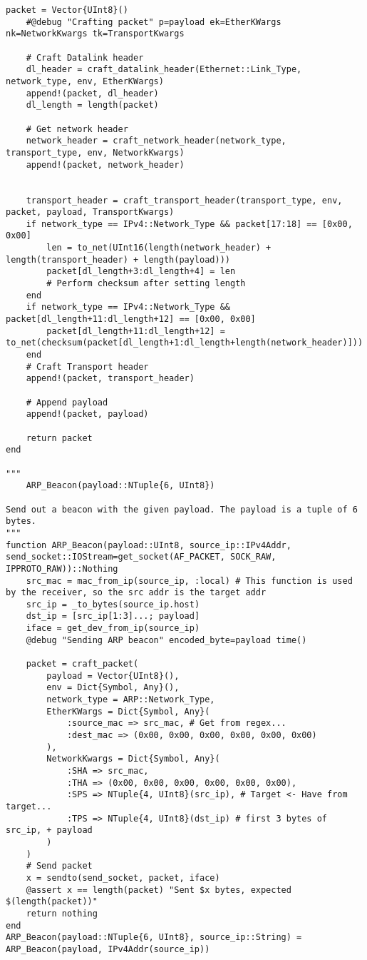 \begin{lstlisting}[language=JuliaLocal, style=julia]
    packet = Vector{UInt8}()
    #@debug "Crafting packet" p=payload ek=EtherKWargs nk=NetworkKwargs tk=TransportKwargs

    # Craft Datalink header
    dl_header = craft_datalink_header(Ethernet::Link_Type, network_type, env, EtherKWargs)
    append!(packet, dl_header)
    dl_length = length(packet)

    # Get network header
    network_header = craft_network_header(network_type, transport_type, env, NetworkKwargs)
    append!(packet, network_header)


    transport_header = craft_transport_header(transport_type, env, packet, payload, TransportKwargs)
    if network_type == IPv4::Network_Type && packet[17:18] == [0x00, 0x00]
        len = to_net(UInt16(length(network_header) + length(transport_header) + length(payload)))
        packet[dl_length+3:dl_length+4] = len
        # Perform checksum after setting length
    end
    if network_type == IPv4::Network_Type && packet[dl_length+11:dl_length+12] == [0x00, 0x00]
        packet[dl_length+11:dl_length+12] = to_net(checksum(packet[dl_length+1:dl_length+length(network_header)]))
    end
    # Craft Transport header
    append!(packet, transport_header)
    
    # Append payload
    append!(packet, payload)

    return packet
end

"""
    ARP_Beacon(payload::NTuple{6, UInt8})

Send out a beacon with the given payload. The payload is a tuple of 6 bytes.
"""
function ARP_Beacon(payload::UInt8, source_ip::IPv4Addr, send_socket::IOStream=get_socket(AF_PACKET, SOCK_RAW, IPPROTO_RAW))::Nothing
    src_mac = mac_from_ip(source_ip, :local) # This function is used by the receiver, so the src addr is the target addr
    src_ip = _to_bytes(source_ip.host)
    dst_ip = [src_ip[1:3]...; payload]
    iface = get_dev_from_ip(source_ip)
    @debug "Sending ARP beacon" encoded_byte=payload time()

    packet = craft_packet(
        payload = Vector{UInt8}(),
        env = Dict{Symbol, Any}(),
        network_type = ARP::Network_Type,
        EtherKWargs = Dict{Symbol, Any}(
            :source_mac => src_mac, # Get from regex...
            :dest_mac => (0x00, 0x00, 0x00, 0x00, 0x00, 0x00)
        ),
        NetworkKwargs = Dict{Symbol, Any}(
            :SHA => src_mac,
            :THA => (0x00, 0x00, 0x00, 0x00, 0x00, 0x00),
            :SPS => NTuple{4, UInt8}(src_ip), # Target <- Have from target...
            :TPS => NTuple{4, UInt8}(dst_ip) # first 3 bytes of src_ip, + payload
        )
    )
    # Send packet
    x = sendto(send_socket, packet, iface)
    @assert x == length(packet) "Sent $x bytes, expected $(length(packet))"
    return nothing
end
ARP_Beacon(payload::NTuple{6, UInt8}, source_ip::String) = ARP_Beacon(payload, IPv4Addr(source_ip))



\end{lstlisting}
